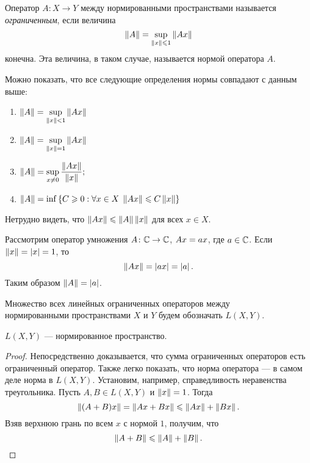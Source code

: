 \begin{definition}
    Оператор $A \colon X \to Y$ между нормированными пространствами 
    называется \emph{ограниченным}, если величина
    \[ \left\|A\right\| = \sup_{\left\|x\right\| \leqslant 1} \left\|Ax\right\| \]
    конечна. Эта величина, в таком случае, называется нормой оператора $A$.
\end{definition}

Можно показать, что все следующие определения нормы совпадают с данным выше:
\begin{enumerate}
    \item $ \left\|A\right\| = \sup\limits_{\left\|x\right\| < 1} \left\|Ax\right\| $
    \item $ \left\|A\right\| = \sup\limits_{\left\|x\right\| = 1} \left\|Ax\right\| $
    \item $ \left\|A\right\| = \sup\limits_{x\neq 0}\displaystyle\frac{\left\|Ax\right\|}{\left\|x\right\|}; $
    \item $ \left\|A\right\| = \inf\left\{C \geqslant 0 : \forall x \in X \; \left\|Ax\right\| \leqslant C
        \left\|x\right\|\right\} $
\end{enumerate}

Нетрудно видеть, что $\left\|Ax\right\| \leqslant \left\|A\right\|\left\|x\right\|$ для всех $x \in X$.

\begin{example}
    Рассмотрим оператор умножения $A \colon \mathbb{C} \to \mathbb{C}$, $\\Ax = ax$,
    где $a \in \mathbb{C}$. Если $\left\|x\right\| = \left|x\right| = 1$, то 
    \[ \left\|Ax\right\| = \left|ax\right| = \left|a\right|. \]
    Таким образом $\left\|A\right\| = \left|a\right|$.
\end{example}

Множество всех линейных ограниченных операторов между \\ нормированными
пространствами $X$ и $Y$ будем обозначать $L(X, Y)$.

\begin{theorem}
    $L(X, Y)$ --- нормированное пространство.
\end{theorem}

\begin{proof}
    Непосредственно доказывается, что сумма ограниченных
    операторов есть ограниченный оператор. Также легко показать, что норма
    оператора --- в самом деле норма в $L(X, Y)$. Установим, например,
    справедливость неравенства треугольника. Пусть $A, B \in L(X, Y)$ и
    $\left\|x\right\| = 1$. Тогда
    \[ \left\|(A+B)x\right\| = \left\|Ax+Bx\right\| \leqslant \left\|Ax\right\| + \left\|Bx\right\|. \]
    Взяв верхнюю грань по всем $x$ с нормой $1$, получим, что 
    \[ \left\|A + B\right\| \leqslant \left\|A\right\| + \left\|B\right\|. \]
\end{proof}

